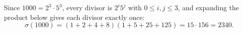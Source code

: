 Since $1000=2^3\cdot5^3$, every divisor is $2^i5^j$ with $0\le i,j\le3$, and expanding the product below gives each divisor exactly once:
\[\sigma(1000)=\left(1+2+4+8\right)\left(1+5+25+125\right)=15\cdot156=\boxed{2340}.\]
